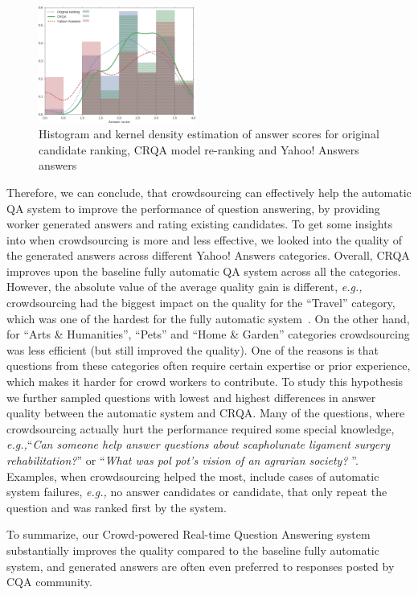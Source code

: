 \documentclass[letterpaper]{article}
\makeatletter
\newcommand{\eg}{\textit{e.g.,}\@\xspace}
\makeatother
\begin{document}
\begin{figure}[h]
	\centering
	\includegraphics[width=0.46\textwidth]{img/score_hist}
	\caption{Histogram and kernel density estimation of answer scores for original candidate ranking, CRQA model re-ranking and Yahoo! Answers answers}
	\label{fig:score_histogram}
\end{figure}

Therefore, we can conclude, that crowdsourcing can effectively help the automatic QA system to improve the performance of question answering, by providing worker generated answers and rating existing candidates.
To get some insights into when crowdsourcing is more and less effective, we looked into the quality of the generated answers across different Yahoo! Answers categories.
Overall, CRQA improves upon the baseline fully automatic QA system across all the categories.
However, the absolute value of the average quality gain is different, \eg crowdsourcing had the biggest impact on the quality for the ``Travel'' category, which was one of the hardest for the fully automatic system~\cite{savenkov_trecliveqa15}.
On the other hand, for ``Arts \& Humanities'', ``Pets'' and ``Home \& Garden'' categories crowdsourcing was less efficient (but still improved the quality).
One of the reasons is that questions from these categories often require certain expertise or prior experience, which makes it harder for crowd workers to contribute.
To study this hypothesis we further sampled questions with lowest and highest differences in answer quality between the automatic system and CRQA.
Many of the questions, where crowdsourcing actually hurt the performance required some special knowledge, \eg ``\textit{Can someone help answer questions about scapholunate ligament surgery rehabilitation?}'' or ``\textit{What was pol pot's vision of an agrarian society? }''.
Examples, when crowdsourcing helped the most, include cases of automatic system failures, \eg no answer candidates or candidate, that only repeat the question and was ranked first by the system.

To summarize, our Crowd-powered Real-time Question Answering system substantially improves the quality compared to the baseline fully automatic system, and generated answers are often even preferred to responses posted by CQA community.
\end{document}
